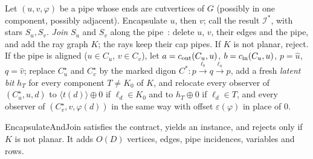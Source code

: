 \begin{definition}[EncapsulateAndJoin]\label{def:eng4-ej}
Let $(u,v,\varphi)$ be a pipe whose ends are cutvertices of $G$ (possibly in
one component, possibly adjacent). Encapsulate $u$, then $v$; call the
result $\mathcal I^\ast$, with stars $S_u,S_v$. \emph{Join}
$S_u$ and $S_v$ along the pipe~\cite[Section~3.2]{BFR21}: delete $u$, $v$,
their edges and the pipe, and add the ray graph $K$; the rays keep their cap
pipes. If $K$ is not planar, reject. If the pipe is aligned ($u\in C_u$,
$v\in C_v$), let $a=c_{\mathrm{out}}(C_u,u)$, $b=c_{\mathrm{in}}(C_u,u)$, $p=\hat u$, $q=\hat v$;
replace $C^\star_u$ and $C^\star_v$ by the marked digon $C^\ast:
p\xrightarrow{\ell_b}q\xrightarrow{\ell_a}p$, add a fresh \emph{latent bit}
$h_T$ for every component $T\ne K_0$ of $K$, and relocate every observer of
$(C^\star_u,u,d)$ to $\langle t(d)\rangle\oplus0$ if $\ell_d\in K_0$ and to
$h_T\oplus0$ if $\ell_d\in T$, and every observer of
$(C^\star_v,v,\varphi(d))$ in the same way with offset
$\varepsilon(\varphi)$ in place of $0$.
\end{definition}

\begin{lemma}[EncapsulateAndJoin]\label{lem:eng4-join}
EncapsulateAndJoin satisfies the contract, yields an
instance, and rejects only if $K$ is not planar. It adds $O(D)$ vertices,
edges, pipe incidences, variables and rows.
\end{lemma}

